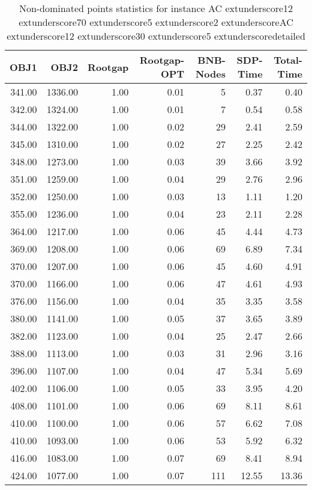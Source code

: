 \begin{table}
\caption{Non-dominated points statistics for instance AC	extunderscore12	extunderscore70	extunderscore5	extunderscore2	extunderscoreAC	extunderscore12	extunderscore30	extunderscore5	extunderscoredetailed}
\label{tab:plots/AC_12_70_5_2_AC_12_30_5_detailed}
\begin{tabular}{rrrrrrr}
\toprule
OBJ1 & OBJ2 & Rootgap & Rootgap-OPT & BNB-Nodes & SDP-Time & Total-Time \\
\midrule
341.00 & 1336.00 & 1.00 & 0.01 & 5 & 0.37 & 0.40 \\
342.00 & 1324.00 & 1.00 & 0.01 & 7 & 0.54 & 0.58 \\
344.00 & 1322.00 & 1.00 & 0.02 & 29 & 2.41 & 2.59 \\
345.00 & 1310.00 & 1.00 & 0.02 & 27 & 2.25 & 2.42 \\
348.00 & 1273.00 & 1.00 & 0.03 & 39 & 3.66 & 3.92 \\
351.00 & 1259.00 & 1.00 & 0.04 & 29 & 2.76 & 2.96 \\
352.00 & 1250.00 & 1.00 & 0.03 & 13 & 1.11 & 1.20 \\
355.00 & 1236.00 & 1.00 & 0.04 & 23 & 2.11 & 2.28 \\
364.00 & 1217.00 & 1.00 & 0.06 & 45 & 4.44 & 4.73 \\
369.00 & 1208.00 & 1.00 & 0.06 & 69 & 6.89 & 7.34 \\
370.00 & 1207.00 & 1.00 & 0.06 & 45 & 4.60 & 4.91 \\
370.00 & 1166.00 & 1.00 & 0.06 & 47 & 4.61 & 4.93 \\
376.00 & 1156.00 & 1.00 & 0.04 & 35 & 3.35 & 3.58 \\
380.00 & 1141.00 & 1.00 & 0.05 & 37 & 3.65 & 3.89 \\
382.00 & 1123.00 & 1.00 & 0.04 & 25 & 2.47 & 2.66 \\
388.00 & 1113.00 & 1.00 & 0.03 & 31 & 2.96 & 3.16 \\
396.00 & 1107.00 & 1.00 & 0.04 & 47 & 5.34 & 5.69 \\
402.00 & 1106.00 & 1.00 & 0.05 & 33 & 3.95 & 4.20 \\
408.00 & 1101.00 & 1.00 & 0.06 & 69 & 8.11 & 8.61 \\
410.00 & 1100.00 & 1.00 & 0.06 & 57 & 6.62 & 7.08 \\
410.00 & 1093.00 & 1.00 & 0.06 & 53 & 5.92 & 6.32 \\
416.00 & 1083.00 & 1.00 & 0.07 & 69 & 8.41 & 8.94 \\
424.00 & 1077.00 & 1.00 & 0.07 & 111 & 12.55 & 13.36 \\

\end{tabular}
\end{table}
